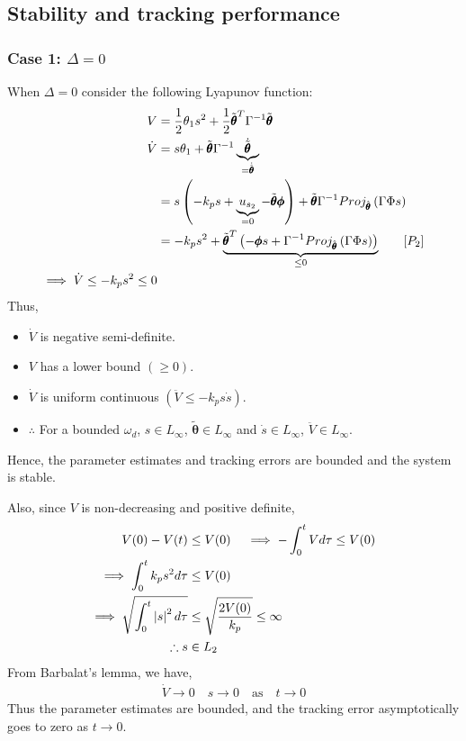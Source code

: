 \subsection{Stability and tracking performance}
\subsubsection{Case 1: $\Delta = 0$}
When $\Delta = 0$ consider the following Lyapunov function:
\begin{align*}
    V &= \frac{1}{2} \theta_1 s^2 + \frac{1}{2} \tilde{\pmb \theta}^T \Gamma^{-1} \tilde{\pmb \theta}\\
    \dot V &= s \theta_1 + \tilde{\pmb \theta} \Gamma^{-1} \underbrace{\dot{\tilde{\pmb \theta}}}_{=\dot{\hat{\pmb \theta}}}\\
    &= s \left(  -k_p s + \underbrace{u_{s_2}}_{=0} - \tilde{\pmb \theta} \pmb \phi  \right) + \tilde{\pmb \theta} \Gamma^{-1} Proj_{\hat{\pmb \theta}} \left( \Gamma \Phi s \right)\\
    &= -k_p s^2 + \underbrace{\tilde{\pmb \theta}^T \left( -\pmb \phi s + \Gamma^{-1}Proj_{\hat{\pmb \theta}} \left( \Gamma \Phi s \right) \right)}_{\leq 0} \qquad [P_2]\\
    \implies \dot V \leq -k_p s^2 \leq 0
\end{align*}
Thus,
\begin{itemize}
    \item $\dot V$ is negative semi-definite.
    \item $V$ has a lower bound $(\geq 0)$.
    \item $\dot V$ is uniform continuous $(\ddot V \leq -k_p s \dot s)$.
    \item $\therefore$ For a bounded $\omega_d$, $s \in L_\infty$, $\tilde{\pmb
    \theta} \in L_{\infty}$ and $\dot s \in L_\infty$, $\ddot V \in L_\infty$.
\end{itemize}

Hence, the parameter estimates and tracking errors are bounded and the system is
stable.

\bigskip

Also, since $V$ is non-decreasing and positive definite,
\begin{align*}
    V(0) - V(t) &\leq V(0) \quad
    \implies -\int_0^t V d \tau \leq V(0)\\
    \implies \int_0^t k_p s^2 d \tau &\leq V(0)\\
    \implies \sqrt{\int_0^t \left\lvert s \right\rvert^2 d \tau } &\leq \sqrt{\frac{2 V(0)}{k_p}} \leq \infty\\
    \therefore s &\in L_2
\end{align*}
From Barbalat's lemma, we have,
\begin{align*}
    \dot V \rightarrow 0 \quad s \rightarrow 0 \quad \text{as} \quad t \rightarrow 0
\end{align*}
Thus the parameter estimates are bounded, and the tracking error asymptotically
goes to zero as  $t \rightarrow 0$.


